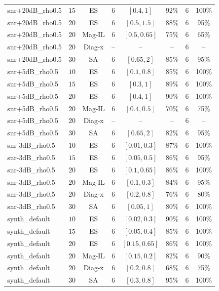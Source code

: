 \begin{longtable}{@{}lccccccc@{}}
snr+20dB\_rho0.5 & \(15\) & ES & \(6\) & \([0.4, 1]\) & 92\% & \(6\) & 100\% \\
snr+20dB\_rho0.5 & \(20\) & ES & \(6\) & \([0.5, 1.5]\) & 88\% & \(6\) & 95\% \\
snr+20dB\_rho0.5 & \(20\) & Mag-IL & \(6\) & \([0.5, 0.65]\) & 75\% & \(6\) & 65\% \\
snr+20dB\_rho0.5 & \(20\) & Diag-x & -- & -- & -- & \(6\) & -- \\
snr+20dB\_rho0.5 & \(30\) & SA & \(6\) & \([0.65, 2]\) & 85\% & \(6\) & 95\% \\
snr+5dB\_rho0.5 & \(10\) & ES & \(6\) & \([0.1, 0.8]\) & 85\% & \(6\) & 100\% \\
snr+5dB\_rho0.5 & \(15\) & ES & \(6\) & \([0.3, 1]\) & 89\% & \(6\) & 100\% \\
snr+5dB\_rho0.5 & \(20\) & ES & \(6\) & \([0.4, 1]\) & 90\% & \(6\) & 100\% \\
snr+5dB\_rho0.5 & \(20\) & Mag-IL & \(6\) & \([0.4, 0.5]\) & 70\% & \(6\) & 75\% \\
snr+5dB\_rho0.5 & \(20\) & Diag-x & -- & -- & -- & \(6\) & -- \\
snr+5dB\_rho0.5 & \(30\) & SA & \(6\) & \([0.65, 2]\) & 82\% & \(6\) & 95\% \\
snr-3dB\_rho0.5 & \(10\) & ES & \(6\) & \([0.01, 0.3]\) & 87\% & \(6\) & 100\% \\
snr-3dB\_rho0.5 & \(15\) & ES & \(6\) & \([0.05, 0.5]\) & 86\% & \(6\) & 95\% \\
snr-3dB\_rho0.5 & \(20\) & ES & \(6\) & \([0.1, 0.65]\) & 86\% & \(6\) & 100\% \\
snr-3dB\_rho0.5 & \(20\) & Mag-IL & \(6\) & \([0.1, 0.3]\) & 84\% & \(6\) & 95\% \\
snr-3dB\_rho0.5 & \(20\) & Diag-x & \(6\) & \([0.2, 0.8]\) & 76\% & \(6\) & 80\% \\
snr-3dB\_rho0.5 & \(30\) & SA & \(6\) & \([0.05, 1]\) & 80\% & \(6\) & 100\% \\
synth\_default & \(10\) & ES & \(6\) & \([0.02, 0.3]\) & 90\% & \(6\) & 100\% \\
synth\_default & \(15\) & ES & \(6\) & \([0.05, 0.4]\) & 85\% & \(6\) & 100\% \\
synth\_default & \(20\) & ES & \(6\) & \([0.15, 0.65]\) & 86\% & \(6\) & 100\% \\
synth\_default & \(20\) & Mag-IL & \(6\) & \([0.15, 0.2]\) & 82\% & \(6\) & 90\% \\
synth\_default & \(20\) & Diag-x & \(6\) & \([0.2, 0.8]\) & 68\% & \(6\) & 75\% \\
synth\_default & \(30\) & SA & \(6\) & \([0.3, 0.8]\) & 95\% & \(6\) & 100\% \\
\bottomrule
\end{longtable}
